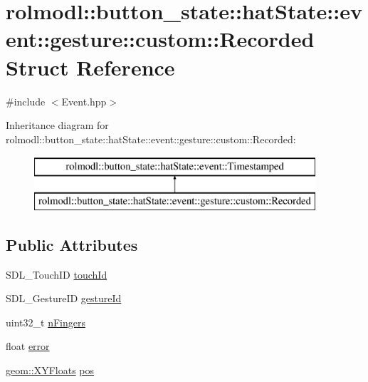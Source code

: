 \hypertarget{structrolmodl_1_1button__state_1_1hat_state_1_1event_1_1gesture_1_1custom_1_1_recorded}{}\section{rolmodl\+::button\+\_\+state\+::hat\+State\+::event\+::gesture\+::custom\+::Recorded Struct Reference}
\label{structrolmodl_1_1button__state_1_1hat_state_1_1event_1_1gesture_1_1custom_1_1_recorded}


{\ttfamily \#include $<$Event.\+hpp$>$}

Inheritance diagram for rolmodl\+::button\+\_\+state\+::hat\+State\+::event\+::gesture\+::custom\+::Recorded\+:\begin{figure}[H]
\begin{center}
\leavevmode
\includegraphics[height=2.000000cm]{structrolmodl_1_1button__state_1_1hat_state_1_1event_1_1gesture_1_1custom_1_1_recorded}
\end{center}
\end{figure}
\subsection*{Public Attributes}
\begin{DoxyCompactItemize}
\item 
S\+D\+L\+\_\+\+Touch\+ID \mbox{\hyperlink{structrolmodl_1_1button__state_1_1hat_state_1_1event_1_1gesture_1_1custom_1_1_recorded_a7e28bfbbc87b60732a306e0aad861ce1}{touch\+Id}}
\item 
S\+D\+L\+\_\+\+Gesture\+ID \mbox{\hyperlink{structrolmodl_1_1button__state_1_1hat_state_1_1event_1_1gesture_1_1custom_1_1_recorded_a515ac18d1c60bbf9e934b61b2fc2806e}{gesture\+Id}}
\item 
uint32\+\_\+t \mbox{\hyperlink{structrolmodl_1_1button__state_1_1hat_state_1_1event_1_1gesture_1_1custom_1_1_recorded_af4d254d2308f51946d5c5ccb0c592cf0}{n\+Fingers}}
\item 
float \mbox{\hyperlink{structrolmodl_1_1button__state_1_1hat_state_1_1event_1_1gesture_1_1custom_1_1_recorded_a4e0b37ed39af3748e179fc3f9dd82e4d}{error}}
\item 
\mbox{\hyperlink{structrolmodl_1_1geom_1_1_x_y_floats}{geom\+::\+X\+Y\+Floats}} \mbox{\hyperlink{structrolmodl_1_1button__state_1_1hat_state_1_1event_1_1gesture_1_1custom_1_1_recorded_a3c876b3d2fe77a3d3f92e4c99faa4ec2}{pos}}
\end{DoxyCompactItemize}


